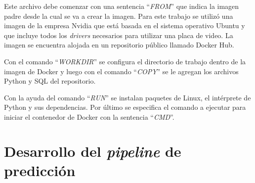 Este archivo debe comenzar con una sentencia ``\textit{FROM}'' que indica la imagen padre desde la cual se va a crear la imagen. Para este trabajo se utilizó una imagen de la empresa Nvidia que está basada en el sistema operativo Ubuntu y que incluye todos los \textit{drivers} necesarios para utilizar una placa de video. La imagen se encuentra alojada en un repositorio público llamado Docker Hub.

Con el comando ``\textit{WORKDIR}'' se configura el directorio de trabajo dentro de la imagen de Docker y luego con el comando ``\textit{COPY}'' se le agregan los archivos Python y SQL del repositorio.

Con la ayuda del comando ``\textit{RUN}'' se instalan paquetes de Linux, el intérprete de Python y sus dependencias. Por último se especifica el comando a ejecutar para iniciar el contenedor de Docker con la sentencia ``\textit{CMD}''.


\section{Desarrollo del \textit{pipeline} de predicción}


